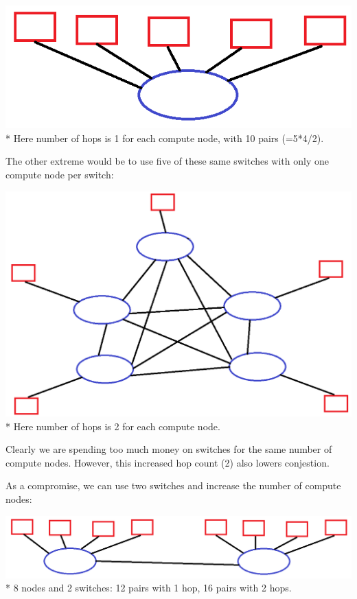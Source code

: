 \documentclass[pdftex]{article}
\begin{document}
\begin{center}
\includegraphics[scale=0.2]{S1_C5.png}\\*
\footnotesize{Here number of hops is 1 for each compute node, with 10 pairs (=5*4/2).}
\end{center}

The other extreme would be to use five of these same switches with only one compute node per switch:

\begin{center}
\includegraphics[scale=0.2]{S5_C5.png}\\*
\footnotesize{Here number of hops is 2 for each compute node.}
\end{center}
Clearly we are spending too much money on switches for the same number of compute nodes. However, this increased hop count (2) also lowers conjestion.

As a compromise, we can use two switches and increase the number of compute nodes:

\begin{center}
\includegraphics[scale=0.2]{S2_C8.png}\\*
\footnotesize{8 nodes and 2 switches: 12 pairs with 1 hop, 16 pairs with 2 hops.}
\end{center}
\end{document}
